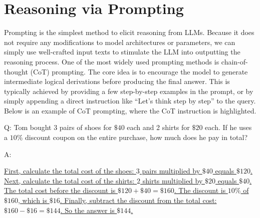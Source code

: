 
\section{Reasoning via Prompting}

Prompting is the simplest method to elicit reasoning from LLMs. Because it does not require any modifications to model architectures or parameters, we can simply use well-crafted input texts to stimulate the LLM into outputting the reasoning process. One of the most widely used prompting methods is chain-of-thought (CoT) prompting. The core idea is to encourage the model to generate intermediate logical derivations before producing the final answer. This is typically achieved by providing a few step-by-step examples in the prompt, or by simply appending a direct instruction like ``Let's think step by step'' to the query. Below is an example of CoT prompting, where the CoT instruction is highlighted.

\vspace{0.5em}
\begin{tcolorbox}

\begingroup
\setlength{\leftskip}{2em}
\setlength{\rightskip}{2em}

Q: Tom bought 3 pairs of shoes for $\$40$ each and 2 shirts for $\$20$ each. If he uses a $10\%$ discount coupon on the entire purchase, how much does he pay in total?

\vspace{0.3em}

A: 

\vspace{0.3em}

\uline{First, calculate the total cost of the shoes: $3$ pairs multiplied by $\$40$ equals $\$120$. Next, calculate the total cost of the shirts: $2$ shirts multiplied by $\$20$ equals $\$40$. The total cost before the discount is $\$120 + \$40 = \$160$. The discount is $10\%$ of $\$160$, which is $\$16$. Finally, subtract the discount from the total cost: $\$160 - \$16 = \$144$. So the answer is $\$144$.}

\endgroup

\end{tcolorbox}
\vspace{0.5em}

